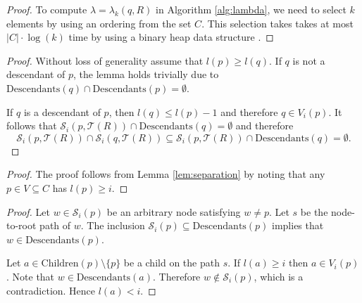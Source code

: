 \documentclass[a4paper,UKenglish,cleveref, autoref]{lipics-v2019}
\numberwithin{algocf}{section}
\theoremstyle{definition}
\theoremstyle{definition}
\theoremstyle{definition}
\theoremstyle{plain}
\newcommand{\Child}{\mathrm{Children}}
\newcommand{\Desc}{\mathrm{Descendants}}
\newcommand{\T}{\mathcal{T}}
\newcommand{\Sd}{\mathcal{S}}
\begin{document}
\lemtimelambdapoint*
\begin{proof}
To compute $\lambda = \lambda_k(q,R)$ in Algorithm \ref{alg:lambda}, we need to select $k$ elements by using an ordering from the set $C$.
This selection takes takes at most $|C| \cdot \log(k)$ time by using a binary heap data structure \cite[section~6.5]{Cormen1990}.
\end{proof}

\lemseparation*
\begin{proof}
Without loss of generality assume that $l(p) \geq l(q)$. If $q$ is not a descendant of $p$, the lemma holds trivially due to $\Desc(q) \cap \Desc(p) = \emptyset$. 
\medskip

If $q$ is a descendant of $p$, then $l(q) \leq l(p) - 1$ and therefore $q \in V_i(p)$. 
It follows that
$\Sd_i(p , \T(R)) \cap \Desc(q) = \emptyset$ and therefore
$$\Sd_{i}(p, \T(R)) \cap \Sd_{i}(q, \T(R))   \subseteq \Sd_{i}(p, \T(R)) \cap \Desc(q) = \emptyset.$$ 
\end{proof}

\lemsum*
\begin{proof}
The proof follows from Lemma \ref{lem:separation} by noting that any $p \in V \subseteq C$ has $l(p) \geq i$.
\end{proof}

\lemdistinctivedescendantchildlevel*
\begin{proof}
Let $w \in \Sd_i(p)$ be an arbitrary node satisfying $w \neq p$. 
Let $s$ be the node-to-root path of $w$. 
The inclusion $\Sd_i(p) \subseteq \Desc(p)$ implies that $w \in \Desc(p)$. 
\medskip

Let $a \in \Child(p) \setminus \{p\}$ be a child on the path $s$. 
If $l(a) \geq i$ then $a \in V_i(p)$. 
Note that $w \in \Desc(a)$.
Therefore $w \notin \Sd_i(p)$, which is a contradiction.
Hence $l(a) < i$. 
\end{proof}
\end{document}
